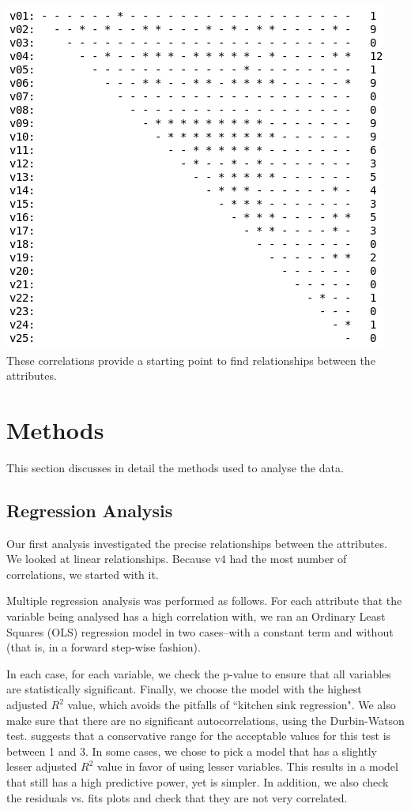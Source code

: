 \documentclass[smallextended]{svjour3}
\begin{document}
	\includegraphics[scale=0.4]{fig1.png}
	\begingroup
	\endgroup
	\hfill\break
	These correlations provide a starting point to find relationships between the attributes.
	
	\section{Methods}
	This section discusses in detail the methods used to analyse the data.
	
	\subsection{Regression Analysis}
	Our first analysis investigated the precise relationships between the attributes. We looked at linear relationships. Because v4 had the most number of correlations, we started with it.
	
	Multiple regression analysis was performed as follows. For each attribute that the variable being analysed has a high correlation with, we ran an Ordinary Least Squares (OLS) regression model in two cases--with a constant term and without (that is, in a forward step-wise fashion). 
	
	In each case, for each variable, we check the p-value to ensure that all variables are statistically significant. Finally, we choose the model with the highest adjusted $R^2$ value, which avoids the pitfalls of ``kitchen sink regression". We also make sure that there are no significant autocorrelations, using the Durbin-Watson test. \cite{field2009discovering} suggests that a conservative range for the acceptable values for this test is between 1 and 3. In some cases, we chose to pick a model that has a slightly lesser adjusted $R^2$ value in favor of using lesser variables. This results in a model that still has a high predictive power, yet is simpler. In addition, we also check the residuals vs. fits plots and check that they are not very correlated. 
	
\end{document}
